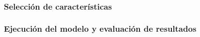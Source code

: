 



\subsubsection{Selección de características}





\subsubsection{Ejecución del modelo y evaluación de resultados}